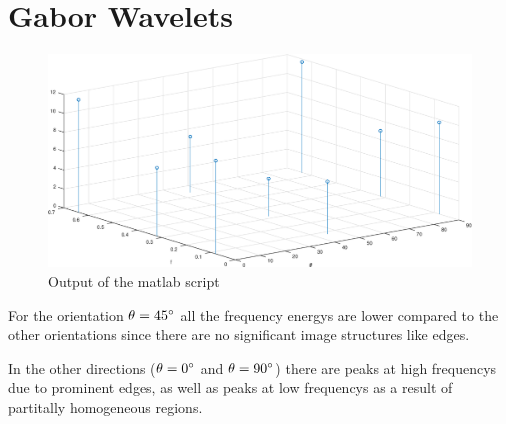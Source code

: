 \documentclass[DIN, pagenumber=false, fontsize=11pt, parskip=half]{scrartcl}
\begin{document}
    \section{Gabor Wavelets}
    
    \begin{figure}[H]
        \centering
        \includegraphics[width=\textwidth]{sh05ex03.eps}
        \caption{Output of the matlab script}
    \end{figure}
    For the orientation $\theta = 45 \degree$ all the frequency energys are lower compared to the other orientations since there are no significant image structures
    like edges.

    In the other directions ($\theta = 0 \degree$ and $\theta = 90\degree$) there are peaks at high frequencys due to prominent edges, as well as peaks at low
    frequencys as a result of partitally homogeneous regions.
\end{document}
